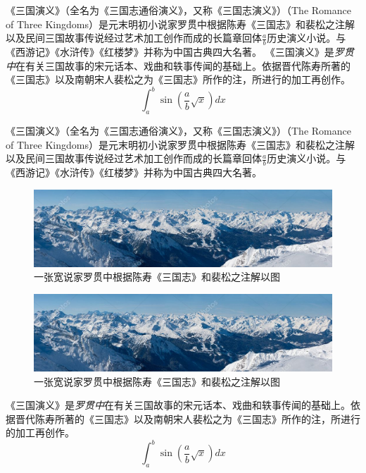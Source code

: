 《三国演义》（全名为《三国志通俗演义》，又称《三国志演义》）（The Romance of Three Kingdoms）是元末明初小说家罗贯中根据陈寿《三国志》和裴松之注解以及民间三国故事传说经过艺术加工创作而成的长篇章回体$\frac{a}{b}$历史演义小说。与《西游记》《水浒传》《红楼梦》并称为中国古典四大名著。
《三国演义》是\emph{罗贯中}在有关{\sffamily 三国故事的宋元话本}、戏曲和轶事传闻的基础上。依据晋代陈寿所著的《三国志》以及南朝宋人裴松之为《三国志》所作的注，所进行的加工再创作。
\begin{equation}
    \int_a^b\sin(\frac{a}{b}\sqrt{x})dx
\end{equation}

《三国演义》（全名为《三国志通俗演义》，又称《三国志演义》）（The Romance of Three Kingdoms）是元末明初小说家罗贯中根据陈寿《三国志》和裴松之注解以及民间三国故事传说经过艺术加工创作而成的长篇章回体$\frac{a}{b}$历史演义小说。与《西游记》《水浒传》《红楼梦》并称为中国古典四大名著。
\begin{figure}
    \includegraphics[width=\linewidth]{images/wide.jpeg}
    \caption{一张宽说家罗贯中根据陈寿《三国志》和裴松之注解以图}
\end{figure}
\begin{figure}
    \includegraphics[width=\linewidth]{images/wide.jpeg}
    \caption{一张宽说家罗贯中根据陈寿《三国志》和裴松之注解以图}
\end{figure}
《三国演义》是\emph{罗贯中}在有关{\sffamily 三国故事的宋元话本}、戏曲和轶事传闻的基础上。依据晋代陈寿所著的《三国志》以及南朝宋人裴松之为《三国志》所作的注，所进行的加工再创作。
\begin{equation}
    \int_a^b\sin(\frac{a}{b}\sqrt{x})dx
\end{equation}

